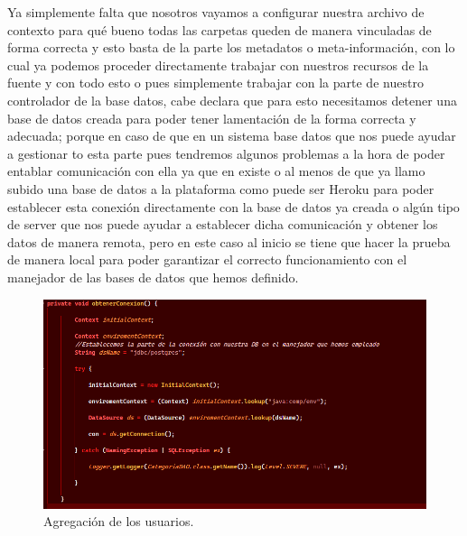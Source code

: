 \documentclass[10pt,a4paper]{article}
\begin{document}
Ya simplemente falta que nosotros vayamos a configurar nuestra archivo de contexto para qué bueno todas las carpetas queden de manera vinculadas de forma correcta y esto basta de la parte los metadatos o meta-información, con lo cual ya podemos proceder directamente trabajar con nuestros recursos de la fuente y con todo esto o pues simplemente trabajar con la parte de nuestro controlador de la base datos, cabe declara que para esto necesitamos detener una base de datos creada para poder tener lamentación de la forma correcta y adecuada; porque en caso de que en un sistema base datos que nos puede ayudar a gestionar to esta parte pues tendremos algunos problemas a la hora de poder entablar comunicación con ella ya que en existe o al menos de que ya llamo subido una base de datos a la plataforma como puede ser Heroku para poder establecer esta conexión directamente con la base de datos ya creada o algún tipo de server que nos puede ayudar a establecer dicha comunicación y obtener los datos de manera remota, pero en este caso al inicio se tiene que hacer la prueba de manera local para poder garantizar el correcto funcionamiento con el manejador de las bases de datos que hemos definido.
\begin{figure}[h]
\centering
\includegraphics[width=12cm]{4XX}
\caption{Agregación de los usuarios.}
\label{fig:re1}
\end{figure}
\vspace{160mm}
\end{document}
